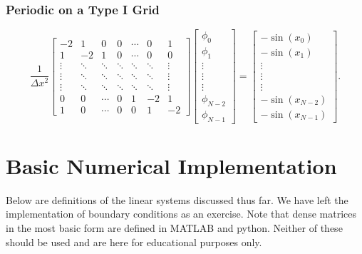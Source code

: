 \subsubsection*{Periodic on a Type I Grid}
\begin{equation}
    \frac{1}{\Delta x^2}
    \begin{bmatrix}
        -2 & 1 & 0& 0& \cdots & 0 & 1\\
        1 & -2 & 1 &0 &\cdots & 0 & 0\\
         \vdots & \ddots & \ddots & \ddots & \ddots& \ddots & \vdots\\
          \vdots & \ddots & \ddots & \ddots & \ddots & \ddots& \vdots\\
                    \vdots & \ddots & \ddots & \ddots & \ddots &  \ddots & \vdots\\
          0& 0 &\cdots & 0 & 1 & -2 & 1 \\
          1& 0 & \cdots & 0 & 0& 1 & -2
    \end{bmatrix}
    \begin{bmatrix}
        \phi_0 \\ \phi_1 \\ \vdots \\ \vdots \\ \vdots \\ \phi_{N-2} \\ \phi_{N-1}
    \end{bmatrix}
    =
    \begin{bmatrix}
        -\sin(x_0)  \\
        -\sin(x_1) \\
        \vdots \\
                \vdots \\
                          \vdots \\
        -\sin(x_{N-2}) \\
        -\sin(x_{N-1}) 
    \end{bmatrix}.
    \label{DoubleTypeIISolver}
\end{equation}



\section{Basic Numerical Implementation}
Below are definitions of the linear systems discussed thus far. We have left the implementation of boundary conditions as an exercise. Note that dense matrices in the most basic form are defined in MATLAB and python. Neither of these should be used and are here for educational purposes only.

